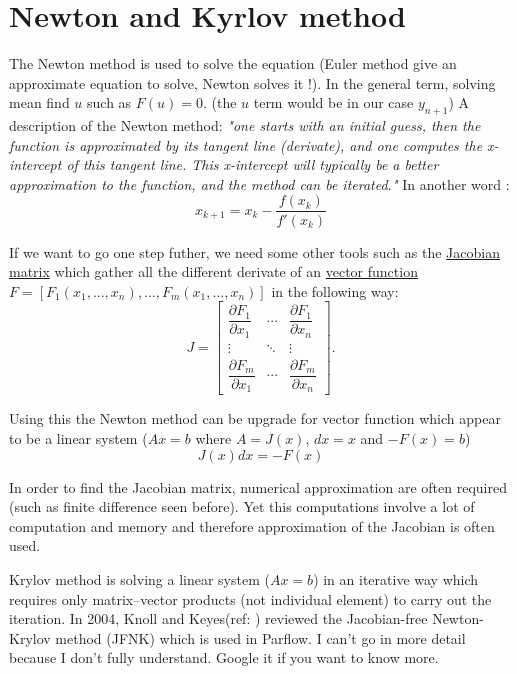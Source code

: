 \documentclass[11pt,a4paper]{report}
\begin{document}
\section{Newton and Kyrlov method}
The Newton method is used to solve the equation (Euler method give an approximate equation to solve, Newton solves it !). In the general term, solving mean find $u$ such as $F(u)=0$. (the $u$ term would be in our case $y_{n+1}$) A description of the Newton method:
\textit{"one starts with an initial guess, then the function is approximated by its tangent line (derivate), and one computes the x-intercept of this tangent line. This x-intercept will typically be a better approximation to the function, and the method can be iterated."}
In another word : 
\begin{equation}
x_{k+1}=x_k-\frac{f(x_k)}{f'(x_k)}
\end{equation}


If we want to go one step futher, we need some other tools such as the \href{https://en.wikipedia.org/wiki/Jacobian_matrix_and_determinant}{Jacobian matrix} which gather all the different derivate of an \href{https://en.wikipedia.org/wiki/Vector-valued_function}{vector function} $F=[F_1(x_1,...,x_n),...,F_m(x_1,...,x_n)]$  in the following way:
\begin{equation}
J=\begin{bmatrix} \dfrac{\partial F_1}{\partial x_1} & \cdots & \dfrac{\partial F_1}{\partial x_n} \\ \vdots & \ddots & \vdots \\ \dfrac{\partial F_m}{\partial x_1} & \cdots & \dfrac{\partial F_m}{\partial x_n}  \end{bmatrix}.
\end{equation}

Using this the Newton method can be upgrade for vector function which appear to be a linear system ($Ax=b$ where $A=J(x)$, $dx=x$ and $-F(x)=b$)
\begin{equation}
J(x)dx=-F(x)
\end{equation}

In order to find the Jacobian matrix, numerical approximation are often required (such as finite difference seen before). Yet this computations involve a lot of computation and memory and therefore approximation of the Jacobian is often used.

Krylov method is solving a linear system ($Ax=b$) in an iterative way which requires only matrix–vector products (not individual element) to carry out the iteration. In 2004, Knoll and Keyes(ref: ) reviewed the Jacobian-free Newton-Krylov method (JFNK) which is used in Parflow. I can't go in more detail because I don't fully understand. Google it if you want to know more.
\end{document}
